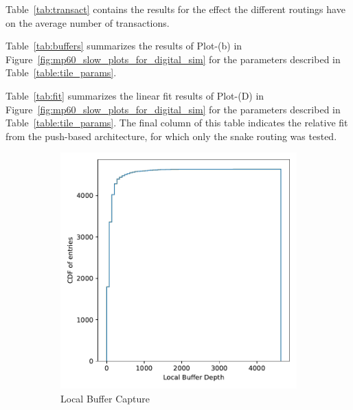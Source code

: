 Table~\ref{tab:transact} contains the results for the effect the different routings have on the average number of transactions.

Table~\ref{tab:buffers} summarizes the results of Plot-(b) in Figure~\ref{fig:mp60_slow_plots_for_digital_sim} for the parameters described in Table~\ref{table:tile_params}.

Table~\ref{tab:fit} summarizes the linear fit results of Plot-(D) in Figure~\ref{fig:mp60_slow_plots_for_digital_sim} for the parameters described in Table~\ref{table:tile_params}.
The final column of this table indicates the relative fit from the push-based architecture, for which only the snake routing was tested.

\begin{figure}
  \centering
  \begin{subfigure}[b]{0.475\textwidth}
      \centering
      \includegraphics[width=\textwidth]{./images/mp60_16_slow_local_stack.pdf}
      \caption[]%
      {{\small Local Buffer Capture}}    
  \end{subfigure}
  \hfill
  \begin{subfigure}[b]{0.475\textwidth}  
      \centering 

\end{subfigure}
\end{figure}
